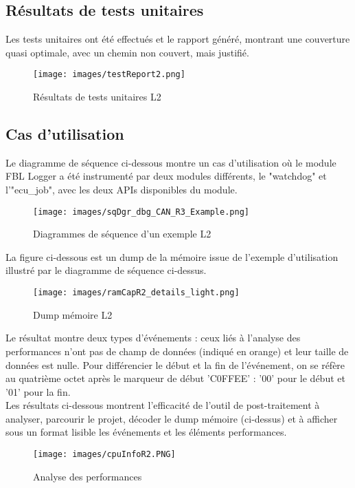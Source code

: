 \documentclass[a4paper, 12pt]{report}
\begin{document}
  \subsection{Résultats de tests unitaires}
   Les tests unitaires ont été effectués et le rapport généré, montrant une couverture quasi optimale, avec un chemin non couvert, mais justifié.
   \begin{figure}[H]
       \centering
       \texttt{[image: images/testReport2.png]}
       \caption{Résultats de tests unitaires L2}
       \label{fig:testU_L2}
   \end{figure}

   \subsection{Cas d'utilisation}
    Le diagramme de séquence ci-dessous montre un cas d’utilisation où le module FBL
    Logger a été instrumenté par deux modules différents, le "watchdog" et l’"ecu\_job", avec les deux APIs disponibles du module. 
    \begin{figure}[H]
            \centering
            \texttt{[image: images/sqDgr\_dbg\_CAN\_R3\_Example.png]}
            \caption{Diagrammes de séquence d'un exemple L2}
            \label{fig:ExempleL2}
    \end{figure}

    La figure ci-dessous est un dump de la mémoire issue de l'exemple d'utilisation illustré par le diagramme de séquence ci-dessus.
    
        \begin{figure}[H]
            \centering
            \texttt{[image: images/ramCapR2\_details\_light.png]}
            \caption{Dump mémoire L2}
    \end{figure}
    Le résultat montre deux types d'événements : ceux liés à l'analyse des performances n'ont pas de champ de données (indiqué en orange) et leur taille de données est nulle. Pour différencier le début et la fin de l'événement, on se réfère au quatrième octet après le marqueur de début 'C0FFEE' : '00' pour le début et '01' pour la fin.\\
    
   Les résultats ci-dessous montrent l'efficacité de l'outil de post-traitement à analyser, parcourir le projet, décoder le dump mémoire (ci-dessus) et à afficher sous un format lisible les événements et les éléments performances.


        \begin{figure}[H]
            \centering
            \texttt{[image: images/cpuInfoR2.PNG]}
            \caption{Analyse des performances}
        \end{figure}
\end{document}
